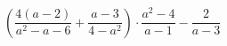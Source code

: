 \begin{ex}[type=simplify_calculate]
	\begin{condition}
		\( \left( \dfrac{4(a-2)}{a^2-a-6}+\dfrac{a-3}{4-a^2} \right)\cdot\dfrac{a^2-4}{a-1}-\dfrac{2}{a-3} \)
	\end{condition}
\end{ex}